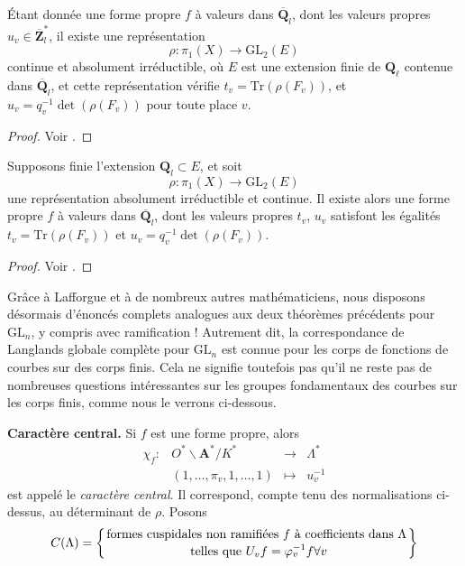 \begin{theorem}
\label{theorem-drinfeld-make-rho}
Étant donnée une forme propre $f$ à valeurs dans
$\overline{\mathbf{Q}}_l$, dont les valeurs propres
$u_v\in \overline{\mathbf{Z}}_l^*$, il existe une représentation
$$
\rho : \pi_1(X)\to \text{GL}_2(E)
$$
continue et absolument irréductible, où
$E$ est une extension finie de $\mathbf{Q}_\ell$ contenue dans
$\overline{\mathbf{Q}}_l$, et cette représentation vérifie
$t_v = \text{Tr}(\rho(F_v))$, et
$u_v = q_v^{-1}\det\left(\rho(F_v)\right)$ pour toute place $v$.
\end{theorem}

\begin{proof}
Voir \cite{D0}.
\end{proof}

\begin{theorem}
\label{theorem-drinfeld-make-f}
Supposons finie l'extension $\mathbf{Q}_l \subset E$, et soit
$$
\rho : \pi_1(X)\to \text{GL}_2(E)
$$
une représentation absolument irréductible et continue. Il existe alors une forme propre $f$ à
valeurs dans $\overline{\mathbf{Q}}_l$, dont les valeurs propres $t_v$, $u_v$
satisfont les égalités
$t_v = \text{Tr}(\rho(F_v))$ et $u_v = q_v^{-1}\det(\rho(F_v))$.
\end{theorem}

\begin{proof}
Voir \cite{D1}.
\end{proof}

\begin{remark}
\label{remark-lafforgue}
Grâce à Lafforgue et à de nombreux autres mathématiciens, nous disposons désormais
d'énoncés complets analogues aux deux théorèmes précédents pour $\text{GL}_n$,
y compris avec ramification !
Autrement dit, la correspondance de Langlands globale complète pour $\text{GL}_n$
est connue pour les corps de fonctions de courbes sur des corps finis. Cela
ne signifie toutefois pas qu'il ne reste pas de nombreuses questions intéressantes
sur les groupes fondamentaux des courbes sur les corps finis, comme
nous le verrons ci-dessous.
\end{remark}

\noindent
{\bf Caractère central.} Si $f$ est une forme propre, alors
$$
\begin{matrix}
\chi_f : &
O^*\backslash \mathbf{A}^*/K^* &
\to &
\Lambda^* \\
&
(1, \ldots, \pi_v, 1, \ldots, 1) &
\mapsto &
u_v^{-1}
\end{matrix}
$$
est appelé le {\it caractère central}. Il correspond, compte tenu des
normalisations ci-dessus, au déterminant de $\rho$. Posons
$$
C(\Lambda) =
\left\{
{\text{formes cuspidales non ramifiées } f \text{ à coefficients dans }\Lambda}
\atop {\text{ telles que } U_v f = \varphi_v^{-1}f\forall v}
\right\}
$$

